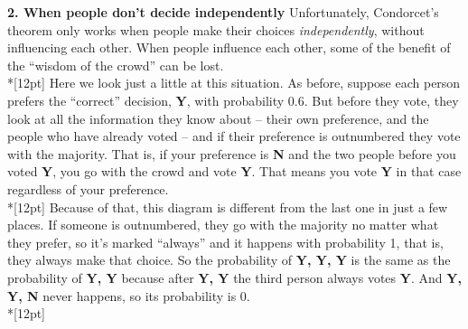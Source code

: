\documentclass{exam}
\begin{document}
\textbf{2. When people don't decide independently}
Unfortunately, Condorcet's theorem only works when people make their choices
\emph{independently}, without influencing each other.  When people influence
each other, some of the benefit of the ``wisdom of the crowd'' can be lost.
\\*[12pt]
Here we look just a little at this situation. As before, suppose each person
prefers the ``correct'' decision, \textbf{Y}, with probability 0.6.  But
before they vote, they look at all the information they know about -- their own
preference, and the people who have already voted -- and if their preference
is outnumbered they vote with the majority.  That is, if your preference is
\textbf{N} and the two people before you voted \textbf{Y}, you go with the
crowd and vote \textbf{Y}. That means you vote \textbf{Y} in that case
regardless of your preference.
\\*[12pt]
Because of that, this diagram is different from the last one
in just a few places. If someone is
outnumbered, they go with the majority no matter what they prefer, so it's
marked ``always'' and it happens with probability 1, that is, they
always make that choice.  So the probability of \textbf{Y, Y, Y} is the
same as the probability of \textbf{Y, Y} because after \textbf{Y, Y} the 
third person always votes \textbf{Y}.  And \textbf{Y, Y, N} never happens,
so its probability is 0.
\\*[12pt]
\end{document}
